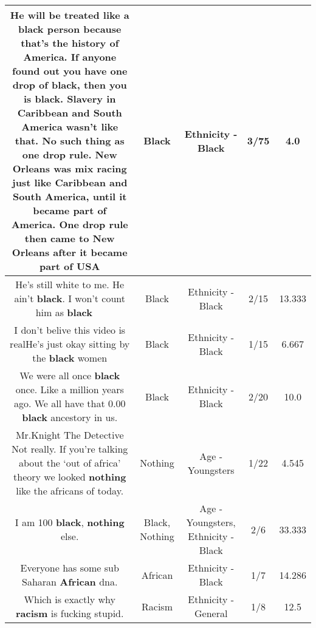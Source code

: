 \documentclass[11pt]{article}
\newlength\mylength
\begin{document}
\begin{center}
\begin{longtable}{|C{.65\mylength}|C{.30\mylength}|C{.12\mylength}|C{.12\mylength}|C{.12\mylength}|}
  \small He will be treated like a \textbf{black} person because that's the history of America. If anyone found out you have one drop of \textbf{black}, then you is \textbf{black}. Slavery in Caribbean and South America wasn't like that. No such thing as one drop rule. New Orleans was mix racing just like Caribbean and South America, until it became part of America. One drop rule then came to New Orleans after it became part of USA\normalsize   & Black & Ethnicity - Black & 3/75 & 4.0 \\  \hline
  \small He's still white to me. He ain't \textbf{black}. I won't count him as \textbf{black} 🤷🏿‍♂️\normalsize   & Black & Ethnicity - Black & 2/15 & 13.333 \\  \hline
  \small I don't belive this video is realHe's just okay sitting by the \textbf{black} women\normalsize   & Black & Ethnicity - Black & 1/15 & 6.667 \\  \hline
  \small We were all once \textbf{black} once. Like a million years ago. We all have that 0.00 \textbf{black} ancestory in us.\normalsize   & Black & Ethnicity - Black & 2/20 & 10.0 \\  \hline
  \small Mr.Knight The Detective Not really. If you're talking about the ‘out of africa' theory we looked \textbf{nothing} like the africans of today.\normalsize   & Nothing & Age - Youngsters & 1/22 & 4.545 \\  \hline
  \small I am 100 \textbf{black}, \textbf{nothing} else.\normalsize   & Black, Nothing & Age - Youngsters, Ethnicity - Black & 2/6 & 33.333 \\  \hline
  \small Everyone has some sub Saharan \textbf{African} dna.\normalsize   & African & Ethnicity - Black & 1/7 & 14.286 \\  \hline
  \small Which is exactly why \textbf{racism} is fucking stupid.\normalsize   & Racism & Ethnicity - General & 1/8 & 12.5 \\  \hline

\end{longtable}
\end{center}
\end{document}
